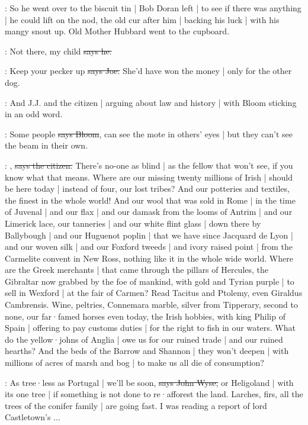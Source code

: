 \Nq:
So he went over to the biscuit tin |
Bob Doran left |
to see if there was anything |
he could lift on the nod,
the old cur after him |
backing his luck |
with his mangy snout up.
Old Mother Hubbard went to the cupboard.

\lenehan:
Not there,
my child
\sout{says he.}

\joe:
Keep your pecker up
\sout{says Joe.}
She'd have won the money |
only for the other dog.

\Nq:
And J.J. and the citizen |
arguing about law and history |
with Bloom sticking in an odd word.

\Bloom:
Some people
\sout{says Bloom},
can see the mote in others' eyes |
but they can't see the beam in their own.

\citizen:
,
\sout{says the citizen.}
There's no-one as blind |
as the fellow that won't see,
if you know what that means.
Where are our missing twenty millions of Irish |
should be here today |
instead of four,
our lost tribes?
And our potteries and textiles,
the finest in the whole world!
And our wool that was sold in Rome |
in the time of Juvenal |
and our flax |
and our damask from the looms of Antrim |
and our Limerick lace,
our tanneries |
and our white flint glass |
down there by Ballybough |
and our Huguenot poplin |
that we have since Jacquard de Lyon |
and our woven silk |
and our Foxford tweeds |
and ivory raised point |
from the Carmelite convent in New Ross,
nothing like it in the whole wide world.
Where are the Greek merchants |
that came through the pillars of Hercules,
the Gibraltar now grabbed by the foe of mankind,
with gold and Tyrian purple |
to sell in Wexford |
at the fair of Carmen?
Read Tacitus and Ptolemy,
even Giraldus Cambrensis.
Wine,
peltries,
Connemara marble,
silver from Tipperary,
second to none,
our far·famed horses even today,
the Irish hobbies,
with king Philip of Spain |
offering to pay customs duties |
for the right to fish in our waters.
What do the yellow·johns of Anglia |
owe us for our ruined trade |
and our ruined hearths?
And the beds of the Barrow and Shannon |
they won't deepen |
with millions of acres of marsh and bog |
to make us all die of consumption?

\johnwyse:
As tree·less as Portugal |
we'll be soon,
\sout{says John Wyse,}
or Heligoland |
with its one tree |
if something is not done to re·afforest the land.
Larches,
firs,
all the trees of the conifer family |
are going fast.
I was reading a report of lord Castletown's ...

